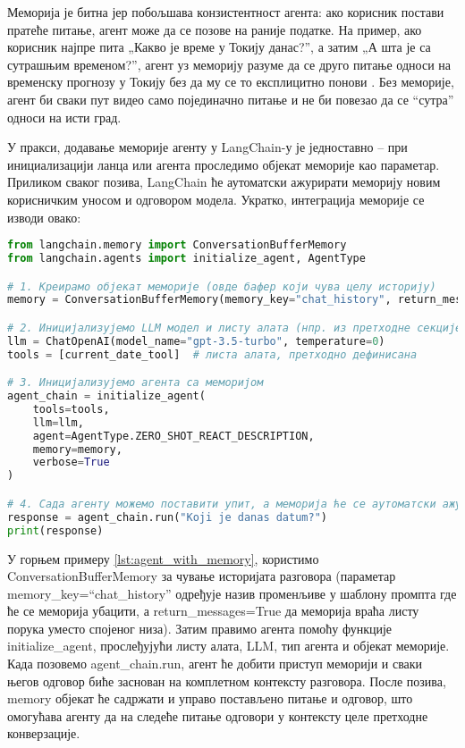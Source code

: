 Меморија је битна јер побољшава конзистентност агента: ако корисник постави пратеће питање, агент може да се позове на раније податке. На пример, ако корисник најпре пита „Какво је време у Токију данас?'', а затим „А шта је са сутрашњим временом?'', агент уз меморију разуме да се друго питање односи на временску прогнозу у Токију без да му се то експлицитно понови \cite{langchain_docs_2024}. Без меморије, агент би сваки пут видео само појединачно питање и не би повезао да се ``сутра'' односи на исти град.

У пракси, додавање меморије агенту у LangChain-у је једноставно -- при инициализацији ланца или агента проследимо објекат меморије као параметар. Приликом сваког позива, LangChain ће аутоматски ажурирати меморију новим корисничким уносом и одговором модела. Укратко, интеграција меморије се изводи овако:

\begin{lstlisting}[language=Python, caption={Креирање агента са меморијом}, label={lst:agent_with_memory}]
from langchain.memory import ConversationBufferMemory
from langchain.agents import initialize_agent, AgentType

# 1. Креирамо објекат меморије (овде бафер који чува целу историју)
memory = ConversationBufferMemory(memory_key="chat_history", return_messages=True)

# 2. Иницијализујемо LLM модел и листу алата (нпр. из претходне секције)
llm = ChatOpenAI(model_name="gpt-3.5-turbo", temperature=0)
tools = [current_date_tool]  # листа алата, претходно дефинисана

# 3. Иницијализујемо агента са меморијом
agent_chain = initialize_agent(
    tools=tools,
    llm=llm,
    agent=AgentType.ZERO_SHOT_REACT_DESCRIPTION,
    memory=memory,
    verbose=True
)

# 4. Сада агенту можемо поставити упит, а меморија ће се аутоматски ажурирати
response = agent_chain.run("Koji je danas datum?")
print(response)
\end{lstlisting}

У горњем примеру \ref{lst:agent_with_memory}, користимо ConversationBufferMemory за чување историјата разговора (параметар memory\_key=``chat\_history'' одређује назив променљиве у шаблону промпта где ће се меморија убацити, а return\_messages=True да меморија враћа листу порука уместо спојеног низа). Затим правимо агента помоћу функције initialize\_agent, прослеђујући листу алата, LLM, тип агента и објекат меморије. Када позовемо agent\_chain.run, агент ће добити приступ меморији и сваки његов одговор биће заснован на комплетном контексту разговора. После позива, memory објекат ће садржати и управо постављено питање и одговор, што омогућава агенту да на следеће питање одговори у контексту целе претходне конверзације.

